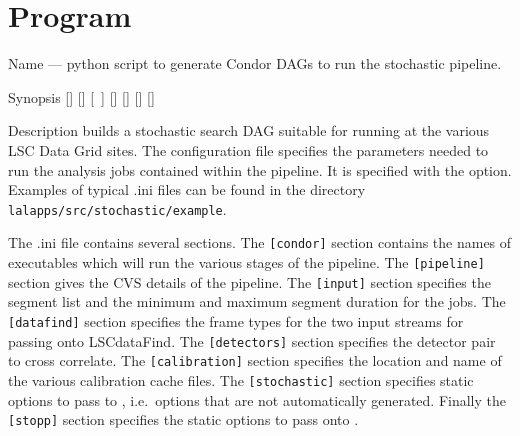 
\section{Program }
\label{program:lalapps-stochastic-pipe}

\begin{entry}
\item[Name]
 --- python script to generate Condor DAGs
to run the stochastic pipeline.

\item[Synopsis]
 \newline \hspace*{0.5in}
[] \newline \hspace*{0.5in}
[] \newline \hspace*{0.5in}
[~] \newline \hspace*{0.5in}
[] \newline \hspace*{0.5in}
[] \newline \hspace*{0.5in}
[] \newline \hspace*{0.5in}
[] \newline \hspace*{0.5in}
~ \newline \hspace*{0.5in}
~

\item[Description]
 builds a stochastic search DAG suitable
for running at the various LSC Data Grid sites. The configuration file
specifies the parameters needed to run the analysis jobs contained
within the pipeline. It is specified with the 
option. Examples of typical .ini files can be found in the directory
\texttt{lalapps/src/stochastic/example}.

The .ini file contains several sections. The \verb$[condor]$ section
contains the names of executables which will run the various stages of
the pipeline. The \verb$[pipeline]$ section gives the CVS details of the
pipeline. The \verb$[input]$ section specifies the segment list and the
minimum and maximum segment duration for the jobs. The \verb$[datafind]$
section specifies the frame types for the two input streams for passing
onto LSCdataFind. The \verb$[detectors]$ section specifies the detector
pair to cross correlate. The \verb$[calibration]$ section specifies the
location and name of the various calibration cache files. The
\verb$[stochastic]$ section specifies static options to pass to
, i.e.~options that are not automatically
generated. Finally the \verb$[stopp]$ section specifies the static
options to pass onto .


\end{entry}
